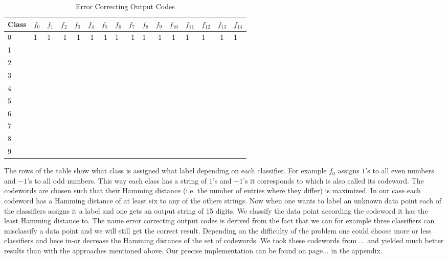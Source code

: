 \begin{table}[ht!]
	\centering
	\caption{Error Correcting Output Codes}
	\label{Codewords}
	\begin{tabular}{|l|l|l|l|l|l|l|l|l|l|l|l|l|l|l|l|}
	\hline
	Class	& $f_0$ & $f_1$ & $f_2$ & $f_3$ & $f_4$ & $f_5$ & $f_6$ & $f_7$ & $f_8$ & $f_9$ & $f_{10}$ & $f_{11}$ & $f_{12}$ & $f_{13}$ & $f_{14}$ \\ \hline \hline
	0	& 1 & 1 & -1 & -1 & -1 & -1 & 1 & -1 & 1 & -1 & -1 & 1 & 1 & -1 & 1 \\ \hline
	1	&  &  &  &  &  &  &  &  &  &  &  &  &  &  & \\ \hline
	2	&  &  &  &  &  &  &  &  &  &  &  &  &  &  & \\ \hline
	3	&  &  &  &  &  &  &  &  &  &  &  &  &  &  & \\ \hline
	4	&  &  &  &  &  &  &  &  &  &  &  &  &  &  & \\ \hline
	5	&  &  &  &  &  &  &  &  &  &  &  &  &  &  & \\ \hline
	6	&  &  &  &  &  &  &  &  &  &  &  &  &  &  & \\ \hline
	7	&  &  &  &  &  &  &  &  &  &  &  &  &  &  & \\ \hline
	8	&  &  &  &  &  &  &  &  &  &  &  &  &  &  & \\ \hline
	9	&  &  &  &  &  &  &  &  &  &  &  &  &  &  & \\ \hline
	\end{tabular}
\end{table}  

The rows of the table show what class is assigned what label depending on each classifier. For example $f_0$ assigns $1$'s to all even numbers and $-1$'s to all odd numbers. This way each class has a string of $1$'s and $-1$'s it corresponds to which is also called its codeword. The codewords are chosen such that their Hamming distance (i.e. the number of entries where they differ) is maximized. In our case each codeword has a Hamming distance of at least six to any of the others strings. Now when one wants to label an unknown data point each of the classifiers assigns it a label and one gets an output string of 15 digits. We classify the data point according the codeword it has the least Hamming distance to. The name error correcting output codes is derived from the fact that we can for example three classifiers can misclassify a data point and we will still get the correct result. Depending on the difficulty of the problem one could choose more or less classifiers and hece in-or decrease the Hamming distance of the set of codewords. We took these codewords from ... and yielded much better results than with the approaches mentioned above. Our precise implementation can be found on page... in the appendix. 

